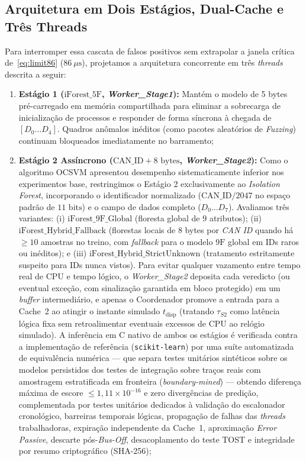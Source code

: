 \documentclass[conference]{IEEEtran}
\begin{document}
\subsection{Arquitetura em Dois Estágios, Dual-Cache e Três Threads}
Para interromper essa cascata de falsos positivos sem extrapolar a janela crítica de~\eqref{eq:limit86} ($86~\mu\text{s}$), projetamos a arquitetura concorrente em três \textit{threads} descrita a seguir:
\begin{enumerate}
    \item \textbf{Estágio 1 ($\text{iForest\_5F}$, \textit{Worker\_Stage1}):} Mantém o modelo de 5 bytes pré-carregado em memória compartilhada para eliminar a sobrecarga de inicialização de processos e responder de forma síncrona à chegada de $[D_0 \dots D_4]$. Quadros anômalos inéditos (como pacotes aleatórios de \textit{Fuzzing}) continuam bloqueados imediatamente no barramento;
    \item \textbf{Estágio 2 Assíncrono ($\text{CAN\_ID} + 8\text{ bytes}$, \textit{Worker\_Stage2}):} Como o algoritmo OCSVM apresentou desempenho sistematicamente inferior nos experimentos base, restringimos o Estágio 2 exclusivamente ao \textit{Isolation Forest}, incorporando o identificador normalizado ($\text{CAN\_ID}/2047$ no espaço padrão de $11\text{ bits}$) e o campo de dados completo ($D_0 \dots D_7$). Avaliamos três variantes: (i) $\text{iForest\_9F\_Global}$ (floresta global de $9$ atributos); (ii) $\text{iForest\_Hybrid\_Fallback}$ (florestas locais de $8$ bytes por \textit{CAN ID} quando há $\ge 10$ amostras no treino, com \textit{fallback} para o modelo $9\text{F}$ global em IDs raros ou inéditos); e (iii) $\text{iForest\_Hybrid\_StrictUnknown}$ (tratamento estritamente suspeito para IDs nunca vistos). Para evitar qualquer vazamento entre tempo real de CPU e tempo lógico, o \textit{Worker\_Stage2} deposita cada veredicto (ou eventual exceção, com sinalização garantida em bloco protegido) em um \textit{buffer} intermediário, e apenas o Coordenador promove a entrada para a Cache~2 ao atingir o instante simulado $t_{\text{disp}}$ (tratando $\tau_{S2}$ como latência lógica fixa sem retroalimentar eventuais excessos de CPU ao relógio simulado). A inferência em C nativo de ambos os estágios é verificada contra a implementação de referência (\texttt{scikit-learn}) por uma suíte automatizada de equivalência numérica \cite{repo_replication} — que separa testes unitários sintéticos sobre os modelos persistidos dos testes de integração sobre traços reais com amostragem estratificada em fronteira (\textit{boundary-mined}) — obtendo diferença máxima de escore $\le 1{,}11 \times 10^{-16}$ e zero divergências de predição, complementada por testes unitários dedicados à validação do escalonador cronológico, barreiras temporais lógicas, propagação de falhas das \textit{threads} trabalhadoras, expiração independente da Cache~1, aproximação \textit{Error Passive}, descarte pós-\textit{Bus-Off}, desacoplamento do teste TOST e integridade por resumo criptográfico (SHA-256);

\end{enumerate}
\end{document}
